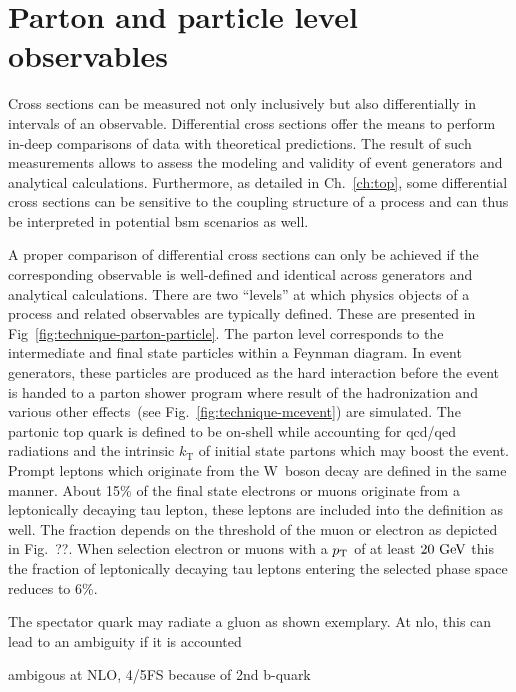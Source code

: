 \section{Parton and particle level observables}

Cross sections can be measured not only inclusively but also differentially in intervals of an observable. Differential cross sections offer the means to perform in-deep comparisons of data with theoretical predictions. The result of such measurements allows to assess the modeling and validity of event generators and analytical calculations. Furthermore, as detailed in Ch.~\ref{ch:top}, some differential cross sections can be sensitive to the coupling structure of a process and can thus be interpreted in potential \gls{bsm} scenarios as well.

A proper comparison of differential cross sections can only be achieved if the corresponding observable is well-defined and identical across generators and analytical calculations. There are two ``levels'' at which physics objects of a process and related observables are typically defined. These are presented in Fig~\ref{fig:technique-parton-particle}. The parton level corresponds to the intermediate and final state particles within a Feynman diagram. In event generators, these particles are produced as the hard interaction before the event is handed to a parton shower program where result of the hadronization and various other effects~(see Fig.~\ref{fig:technique-mcevent}) are simulated. The partonic top quark is defined to be on-shell while accounting for \gls{qcd}/\gls{qed} radiations and the intrinsic $k_\mathrm{T}$ of initial state partons which may boost the event. Prompt leptons which originate from the W~boson decay are defined in the same manner. About 15\% of the final state electrons or muons originate from a leptonically decaying tau lepton, these leptons are included into the definition as well. The fraction depends on the \pt threshold of the muon or electron as depicted in Fig.~??. When selection electron or muons with a $p_\mathrm{T}$ of at least $20~\mathrm{GeV}$ this the fraction of leptonically decaying tau leptons entering the selected phase space reduces to 6\%.


The spectator quark may radiate a gluon as shown exemplary. At \gls{nlo}, this can lead to an ambiguity if it is accounted

ambigous at NLO, 4/5FS because of 2nd b-quark

